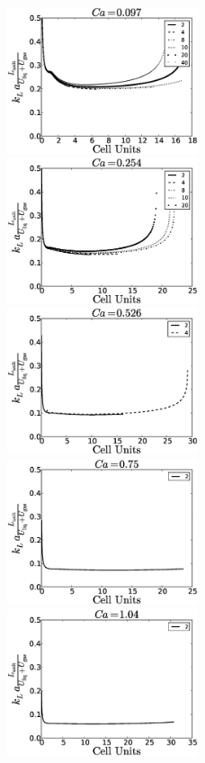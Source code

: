 \documentclass[review,12pt]{elsarticle}
\begin{document}
\begin{figure}[htb!]
\includegraphics[width=0.5\textwidth]{aver_conc_scale_ca097.eps}
\includegraphics[width=0.5\textwidth]{aver_conc_scale_ca054.eps}\\
\includegraphics[width=0.5\textwidth]{aver_conc_scale_ca026.eps}
\includegraphics[width=0.5\textwidth]{aver_conc_scale_ca05.eps}\\
\includegraphics[width=0.5\textwidth]{aver_conc_scale_ca14.eps}

\end{figure}
\end{document}
